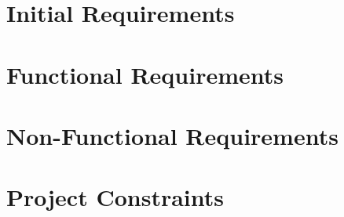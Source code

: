 \section{Initial Requirements}
\label{initial_requirements}


\section{Functional Requirements}
\label{functional_requirements}


\section{Non-Functional Requirements}
\label{non_functional_requirements}


\section{Project Constraints}
\label{project_constraints}

